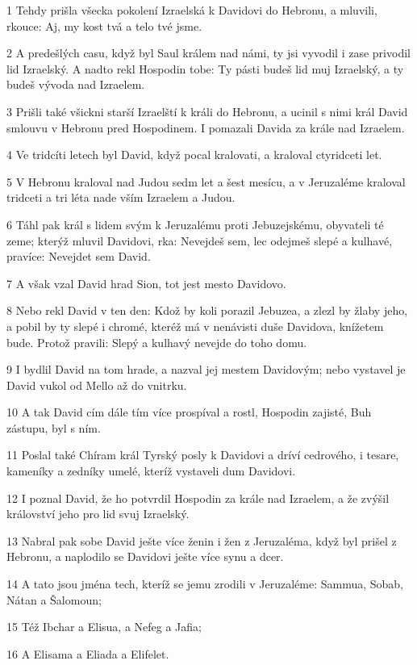 \par 1 Tehdy prišla všecka pokolení Izraelská k Davidovi do Hebronu, a mluvili, rkouce: Aj, my kost tvá a telo tvé jsme.
\par 2 A predešlých casu, když byl Saul králem nad námi, ty jsi vyvodil i zase privodil lid Izraelský. A nadto rekl Hospodin tobe: Ty pásti budeš lid muj Izraelský, a ty budeš vývoda nad Izraelem.
\par 3 Prišli také všickni starší Izraelští k králi do Hebronu, a ucinil s nimi král David smlouvu v Hebronu pred Hospodinem. I pomazali Davida za krále nad Izraelem.
\par 4 Ve tridcíti letech byl David, když pocal kralovati, a kraloval ctyridceti let.
\par 5 V Hebronu kraloval nad Judou sedm let a šest mesícu, a v Jeruzaléme kraloval tridceti a tri léta nade vším Izraelem a Judou.
\par 6 Táhl pak král s lidem svým k Jeruzalému proti Jebuzejskému, obyvateli té zeme; kterýž mluvil Davidovi, rka: Nevejdeš sem, lec odejmeš slepé a kulhavé, pravíce: Nevejdet sem David.
\par 7 A však vzal David hrad Sion, tot jest mesto Davidovo.
\par 8 Nebo rekl David v ten den: Kdož by koli porazil Jebuzea, a zlezl by žlaby jeho, a pobil by ty slepé i chromé, kteréž má v nenávisti duše Davidova, knížetem bude. Protož pravili: Slepý a kulhavý nevejde do toho domu.
\par 9 I bydlil David na tom hrade, a nazval jej mestem Davidovým; nebo vystavel je David vukol od Mello až do vnitrku.
\par 10 A tak David cím dále tím více prospíval a rostl, Hospodin zajisté, Buh zástupu, byl s ním.
\par 11 Poslal také Chíram král Tyrský posly k Davidovi a dríví cedrového, i tesare, kameníky a zedníky umelé, kteríž vystaveli dum Davidovi.
\par 12 I poznal David, že ho potvrdil Hospodin za krále nad Izraelem, a že zvýšil království jeho pro lid svuj Izraelský.
\par 13 Nabral pak sobe David ješte více ženin i žen z Jeruzaléma, když byl prišel z Hebronu, a naplodilo se Davidovi ješte více synu a dcer.
\par 14 A tato jsou jména tech, kteríž se jemu zrodili v Jeruzaléme: Sammua, Sobab, Nátan a Šalomoun;
\par 15 Též Ibchar a Elisua, a Nefeg a Jafia;
\par 16 A Elisama a Eliada a Elifelet.
